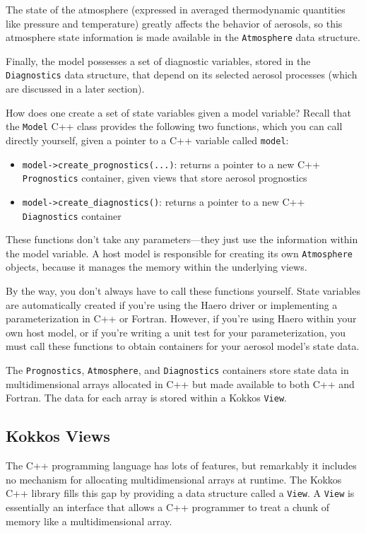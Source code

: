 The state of the atmosphere (expressed in averaged thermodynamic quantities
like pressure and temperature) greatly affects the behavior of aerosols, so
this atmosphere state information is made available in the \texttt{Atmosphere} data
structure.

Finally, the model possesses a set of diagnostic variables, stored in the
\texttt{Diagnostics} data structure, that depend on its selected aerosol processes
(which are discussed in a later section).

How does one create a set of state variables given a model variable? Recall that
the \texttt{Model} C++ class provides the following two functions, which you can
call directly yourself, given a pointer to a C++ variable called \texttt{model}:

\begin{itemize}
  \item \texttt{model->create\_prognostics(...)}: returns a pointer to a new C++
    \texttt{Prognostics} container, given views that store aerosol prognostics
  \item \texttt{model->create\_diagnostics()}: returns a pointer to a new C++
    \texttt{Diagnostics} container
\end{itemize}

These functions don't take any parameters---they just use the information within
the model variable. A host model is responsible for creating its own
\texttt{Atmosphere} objects, because it manages the memory within the underlying
views.

By the way, you don't always have to call these functions yourself. State
variables are automatically created if you're using the Haero driver or
implementing a parameterization in C++ or Fortran. However, if you're using
Haero within your own host model, or if you're writing a unit test for your
parameterization, you must call these functions to obtain containers for your
aerosol model's state data.

The \texttt{Prognostics}, \texttt{Atmosphere}, and \texttt{Diagnostics} containers
store state data in multidimensional arrays allocated in C++ but made available
to both C++ and Fortran. The data for each array is stored within a Kokkos
\texttt{View}.

\subsection*{Kokkos Views}

The C++ programming language has lots of features, but remarkably it includes no
mechanism for allocating multidimensional arrays at runtime. The Kokkos C++
library fills this gap by providing a data structure called a \texttt{View}. A
\texttt{View} is essentially an interface that allows a C++ programmer to treat a
chunk of memory like a multidimensional array.

